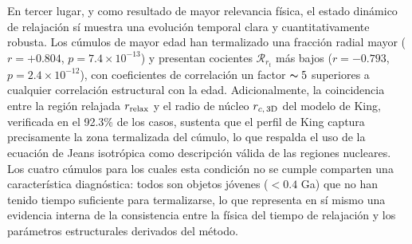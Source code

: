         En tercer lugar, y como resultado de mayor relevancia física, el estado 
        dinámico de relajación sí muestra una evolución temporal clara y 
        cuantitativamente robusta. Los cúmulos de mayor edad han termalizado una 
        fracción radial mayor ($r = +0.804$, $p = 7.4 \times 10^{-13}$) y 
        presentan cocientes $\mathcal{R}_{r_t}$ más bajos ($r = -0.793$, 
        $p = 2.4 \times 10^{-12}$), con coeficientes de correlación un factor 
        $\thicksim 5$ superiores a cualquier correlación estructural con la 
        edad. Adicionalmente, la coincidencia entre la región relajada 
        $r_{\rm relax}$ y el radio de núcleo $r_{c,\, 3{\rm D}}$ del modelo de 
        King, verificada en el 92.3\% de los casos, sustenta que el perfil de 
        King captura precisamente la zona termalizada del cúmulo, lo que 
        respalda el uso de la ecuación de Jeans isotrópica como descripción 
        válida de las regiones nucleares. Los cuatro cúmulos para los cuales 
        esta condición no se cumple comparten una característica diagnóstica: 
        todos son objetos jóvenes ($< 0.4$ Ga) que no han tenido tiempo 
        suficiente para termalizarse, lo que representa en sí mismo una 
        evidencia interna de la consistencia entre la física del tiempo de 
        relajación y los parámetros estructurales derivados del método.